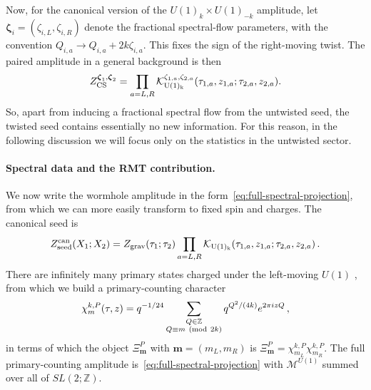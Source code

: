 \documentclass[11pt]{article}
\numberwithin{equation}{section}
\begin{document}
Now, for the canonical version of the $U(1)_k\times U(1)_{-k}$ amplitude, let $\boldsymbol\zeta_i=(\zeta_{i,L},\zeta_{i,R})$ denote the fractional spectral-flow parameters, with the convention $Q_{i,a}\to Q_{i,a}+2k\zeta_{i,a}$. This fixes the sign of the right-moving twist. The paired amplitude in a general background is then
\begin{equation}
Z_{\rm CS}^{\boldsymbol\zeta_1,\boldsymbol\zeta_2}
 =\prod_{a=L,R}\mathcal K_{\rm U(1)_k}^{\zeta_{1,a},\zeta_{2,a}}
 (\tau_{1,a},z_{1,a};\tau_{2,a},z_{2,a}).
\end{equation}
So, apart from inducing a fractional spectral flow from the untwisted seed, the twisted seed contains essentially no new information. For this reason, in the following discussion we will focus only on the statistics in the untwisted sector.



\paragraph{Spectral data and the RMT contribution.}
We now write the wormhole amplitude in the form~\eqref{eq:full-spectral-projection}, from which we can more easily transform to fixed spin and charges. The canonical seed is
\begin{equation}
Z_{\rm seed}^{\mathrm{can}}(X_1;X_2)
 =Z_{\rm grav}(\tau_1;\tau_2)
 \prod_{a=L,R}\mathcal K_{\rm U(1)_k}
 (\tau_{1,a},z_{1,a};\tau_{2,a},z_{2,a})\,.
\label{U(1)_full_seed}
\end{equation}
There are infinitely many primary states charged under the left-moving $U(1)$ , from which we build a primary-counting character
\begin{equation}
\chi_m^{k,P}(\tau,z)
 =q^{-1/24}\sum_{\substack{Q\in\mathbb Z\\Q\equiv m\ ({\rm mod}\ 2k)}}
 q^{Q^2/(4k)}e^{2\pi i zQ}\,,
\label{eq:U1-primary-character}
\end{equation}
in terms of which the object $\Xi^P_{\textbf{m}}$ with $\textbf{m}=(m_L,m_R)$ is $\Xi^P_{\textbf{m}}=\chi^{k,P}_{m_L}\chi^{k,P}_{m_R}$. The full primary-counting amplitude is~\eqref{eq:full-spectral-projection} with $\mathcal{M}^{U(1)}$ summed over all of $SL(2;\mathbb{Z})$.
\end{document}
